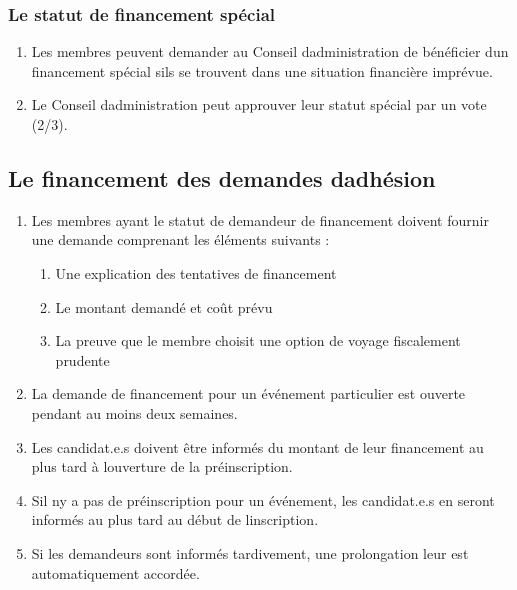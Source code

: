 \subsubsection{Le statut de financement spécial}
\label{le-statut-de-financement-special}

\begin{enumerate}
 \item
  Les membres peuvent demander au Conseil d\textquotesingle administration de bénéficier d\textquotesingle un financement spécial s\textquotesingle ils se trouvent dans une situation financière imprévue.
 \item
  Le Conseil d\textquotesingle administration peut approuver leur statut spécial par un vote (2/3).
\end{enumerate}

\subsection{Le financement des demandes d\textquotesingle adhésion}
\label{le-financement-des-demandes-d-adhesion}

\begin{enumerate}
 \item
  Les membres ayant le statut de demandeur de financement doivent fournir une demande comprenant les éléments suivants :

  \begin{enumerate}
   \item
    Une explication des tentatives de financement
   \item
    Le montant demandé et coût prévu
   \item
    La preuve que le membre choisit une option de voyage fiscalement prudente
  \end{enumerate}
 \item
  La demande de financement pour un événement particulier est ouverte pendant au moins deux semaines.
 \item
  Les candidat.e.s doivent être informés du montant de leur financement au plus tard à l\textquotesingle ouverture de la préinscription.
 \item
  S\textquotesingle il n\textquotesingle y a pas de préinscription pour un événement, les candidat.e.s en seront informés au plus tard au début de l\textquotesingle inscription.
 \item
  Si les demandeurs sont informés tardivement, une prolongation leur est automatiquement accordée.
\end{enumerate}


